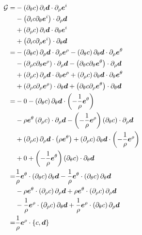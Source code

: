 \begin{align*}
    \mathcal{G}
    =&
    - \left(\partial_\theta c\right) \partial_i \boldsymbol{d}\cdot \partial_\rho \boldsymbol{e}^i
    \\&
    - \left(\partial_i c\partial_\theta\boldsymbol{e}^i\right) \cdot \partial_\rho \boldsymbol{d}
    \\&
    + \left(\partial_\rho c\right) \partial_i \boldsymbol{d} \cdot\partial_\theta \boldsymbol{e}^i
    \\&
    + \left(\partial_i c\partial_\rho\boldsymbol{e}^i\right) \cdot \partial_\theta \boldsymbol{d}
    \\
    =&
    - \left(\partial_\theta c\right) \partial_\rho \boldsymbol{d} \cdot\partial_\rho \boldsymbol{e}^\rho
    - \left(\partial_\theta c\right) \partial_\theta \boldsymbol{d} \cdot\partial_\rho \boldsymbol{e}^\theta
    \\&
    - \left(\partial_\rho c\partial_\theta\boldsymbol{e}^\rho\right) \cdot \partial_\rho \boldsymbol{d}
    - \left(\partial_\theta c\partial_\theta\boldsymbol{e}^\theta\right) \cdot \partial_\rho \boldsymbol{d}
    \\&
    + \left(\partial_\rho c\right) \partial_\rho \boldsymbol{d} \cdot\partial_\theta \boldsymbol{e}^\rho
    + \left(\partial_\rho c\right) \partial_\theta \boldsymbol{d} \cdot\partial_\theta \boldsymbol{e}^\theta
    \\&
    + \left(\partial_\rho c\partial_\rho\boldsymbol{e}^\rho\right) \cdot \partial_\theta \boldsymbol{d}
    + \left(\partial_\theta c\partial_\rho\boldsymbol{e}^\theta\right) \cdot \partial_\theta \boldsymbol{d}
    \\
    =&
    - 0
    - \left(\partial_\theta c\right) \partial_\theta \boldsymbol{d} \cdot\left(-\frac{1}{\rho}\boldsymbol{e}^\theta\right)
    \\&
    - \rho\boldsymbol{e}^\theta\left(\partial_\rho c\right) \cdot \partial_\rho \boldsymbol{d}
    - \left(-\frac{1}{\rho}\boldsymbol{e}^\rho\right)\left(\partial_\theta c\right) \cdot \partial_\rho \boldsymbol{d}
    \\&
    + \left(\partial_\rho c\right) \partial_\rho \boldsymbol{d} \cdot\left(\rho \boldsymbol{e}^\theta\right)
    + \left(\partial_\rho c\right) \partial_\theta \boldsymbol{d} \cdot\left(-\frac{1}{\rho}\boldsymbol{e}^\rho\right)
    \\&
    + 0
    + \left(-\frac{1}{\rho}\boldsymbol{e}^\theta\right)\left(\partial_\theta c\right) \cdot \partial_\theta \boldsymbol{d}
    \\
    =&
     \frac{1}{\rho}\boldsymbol{e}^\theta \cdot \left(\partial_\theta c\right) \partial_\theta \boldsymbol{d}
    -\frac{1}{\rho}\boldsymbol{e}^\theta \cdot \left(\partial_\theta c\right) \partial_\theta \boldsymbol{d}
    \\&
    - \rho \boldsymbol{e}^\theta \cdot \left(\partial_\rho c\right) \partial_\rho \boldsymbol{d}
    + \rho \boldsymbol{e}^\theta \cdot \left(\partial_\rho c\right) \partial_\rho \boldsymbol{d}
    \\&
    - \frac{1}{\rho}\boldsymbol{e}^\rho \cdot \left(\partial_\rho   c\right)\partial_\theta \boldsymbol{d}
    + \frac{1}{\rho}\boldsymbol{e}^\rho \cdot \left(\partial_\theta c\right)\partial_\rho   \boldsymbol{d}
    \\
    =&
    \frac{1}{\rho}\boldsymbol{e}^\rho \cdot \left\{c, \boldsymbol{d}\right\}
\end{align*}

